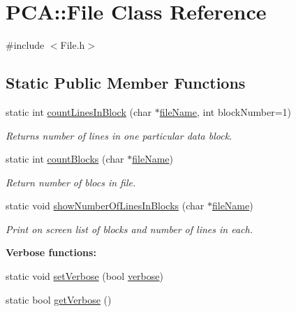 \hypertarget{class_p_c_a_1_1_file}{}\section{P\+CA\+:\+:File Class Reference}
\label{class_p_c_a_1_1_file}


{\ttfamily \#include $<$File.\+h$>$}

\subsection*{Static Public Member Functions}
\begin{DoxyCompactItemize}
\item 
static int \hyperlink{class_p_c_a_1_1_file_a832795e34ab12c9fd127bdf99d89efa3}{count\+Lines\+In\+Block} (char $\ast$\hyperlink{map_end_to_end_movie_8m_acbece2625a541230e9f9091adca38c8c}{file\+Name}, int block\+Number=1)
\begin{DoxyCompactList}\small\item\em Returns number of lines in one particular data block. \end{DoxyCompactList}\item 
static int \hyperlink{class_p_c_a_1_1_file_a25bcd550fcc9e0a948f4c553b330a7a6}{count\+Blocks} (char $\ast$\hyperlink{map_end_to_end_movie_8m_acbece2625a541230e9f9091adca38c8c}{file\+Name})
\begin{DoxyCompactList}\small\item\em Return number of blocs in file. \end{DoxyCompactList}\item 
static void \hyperlink{class_p_c_a_1_1_file_a25dd7a0266edd1fc026f27448003b36f}{show\+Number\+Of\+Lines\+In\+Blocks} (char $\ast$\hyperlink{map_end_to_end_movie_8m_acbece2625a541230e9f9091adca38c8c}{file\+Name})
\begin{DoxyCompactList}\small\item\em Print on screen list of blocks and number of lines in each. \end{DoxyCompactList}\end{DoxyCompactItemize}
\begin{Indent}{\bf Verbose functions\+:}\par
\begin{DoxyCompactItemize}
\item 
static void \hyperlink{class_p_c_a_1_1_file_a71cb80c09faa4be71eb09ae074aac4b2}{set\+Verbose} (bool \hyperlink{class_p_c_a_1_1_file_a7d78765563f9be7e1ca260dcd3c65053}{verbose})
\item 
static bool \hyperlink{class_p_c_a_1_1_file_aa080868b37deb641c3369c397f84fd1b}{get\+Verbose} ()
\end{DoxyCompactItemize}
\end{Indent}
